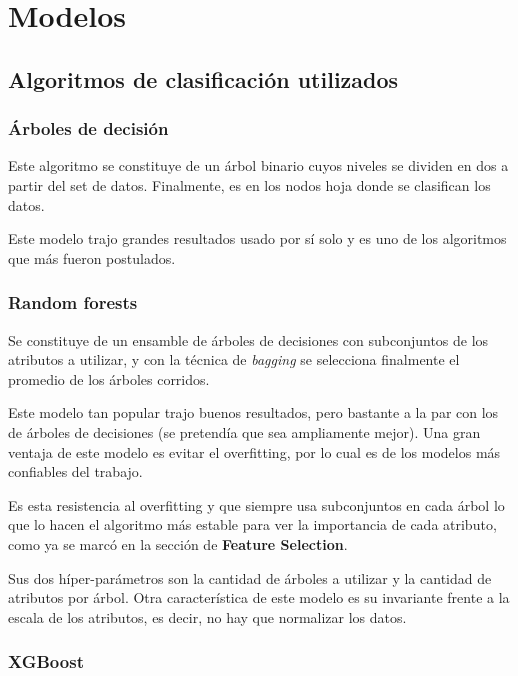\documentclass[a4paper]{article}
\begin{document}
\section{Modelos}

\subsection{Algoritmos de clasificación utilizados}

\subsubsection{Árboles de decisión}

Este algoritmo se constituye de un árbol binario cuyos niveles se dividen en dos a partir del set de datos. Finalmente, es en los nodos hoja donde se clasifican los datos.

Este modelo trajo grandes resultados usado por sí solo y es uno de los algoritmos que más fueron postulados.

\subsubsection{Random forests}

Se constituye de un ensamble de árboles de decisiones con subconjuntos de los atributos a utilizar, y con la técnica de \textit{bagging} se selecciona finalmente el promedio de los árboles corridos.

Este modelo tan popular trajo buenos resultados, pero bastante a la par con los de árboles de decisiones (se pretendía que sea ampliamente mejor). Una gran ventaja de este modelo es evitar el overfitting, por lo cual es de los modelos más confiables del trabajo. 

Es esta resistencia al overfitting y que siempre usa subconjuntos en cada árbol lo que lo hacen el algoritmo más estable para ver la importancia de cada atributo, como ya se marcó en la sección de \textbf{Feature Selection}.

Sus dos híper-parámetros son la cantidad de árboles a utilizar y la cantidad de atributos por árbol. Otra característica de este modelo es su invariante frente a la escala de los atributos, es decir, no hay que normalizar los datos.

\subsubsection{XGBoost}
\end{document}
